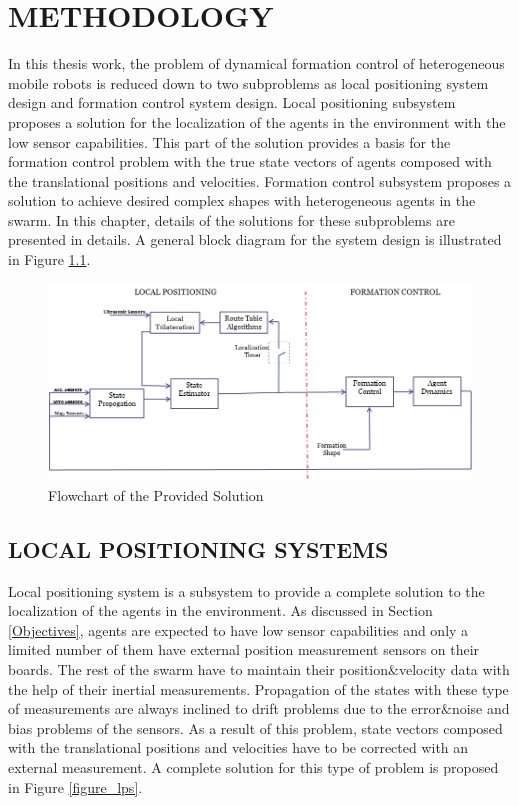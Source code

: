 

\chapter{METHODOLOGY}
\label{chp:Methodology}








In this thesis work, the problem of dynamical formation control of heterogeneous mobile robots is reduced down to two subproblems as local positioning system design and formation control system design. Local positioning subsystem proposes  a  solution for the localization of the agents in the environment with the low sensor capabilities. This part of the solution provides a basis for the formation control problem with the true state vectors of agents composed with the translational positions and velocities. Formation control subsystem proposes a solution to achieve desired complex shapes with heterogeneous agents in the swarm.  In this chapter, details of the solutions for these subproblems are presented in details. A general block diagram for the system design is illustrated in Figure \ref{general_system}.

\begin{figure}[H]
\caption{Flowchart of the Provided Solution} \label{general_system}
\centering
\includegraphics[scale = 0.58]{general_scheme}
\end{figure}

\section{LOCAL POSITIONING SYSTEMS} \label{LOCAL POSITIONING SYSTEMS_ref}
Local positioning system is a subsystem to provide a complete solution to the localization of the agents in the environment. As discussed in Section \ref{Objectives}, agents are expected to have low sensor capabilities and only a limited number of them have external position measurement sensors on their boards. The rest of the swarm have to maintain their position$\&$velocity data with the help of their inertial measurements. Propagation of the states with these type of measurements are always inclined to drift problems due to the error$\&$noise and bias problems of the sensors. As a result of this problem, state vectors composed with the translational positions and velocities have to be corrected with an external measurement. A complete solution for this type of problem is proposed in Figure \ref{figure_lps}.

